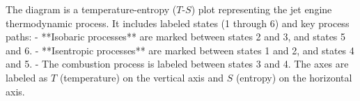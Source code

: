 The diagram is a temperature-entropy (\( T \)-\( S \)) plot representing the jet engine thermodynamic process. It includes labeled states (1 through 6) and key process paths:  
- **Isobaric processes** are marked between states 2 and 3, and states 5 and 6.  
- **Isentropic processes** are marked between states 1 and 2, and states 4 and 5.  
- The combustion process is labeled between states 3 and 4.  
The axes are labeled as \( T \) (temperature) on the vertical axis and \( S \) (entropy) on the horizontal axis.